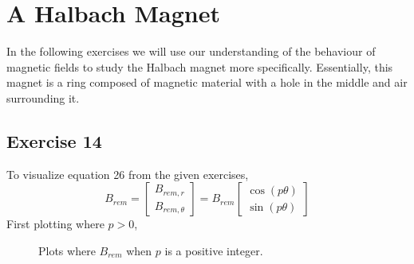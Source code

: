 \documentclass{article}
\begin{document}
\section{A Halbach Magnet}
In the following exercises we will use our understanding of the behaviour of magnetic fields to study the Halbach magnet more specifically. Essentially, this magnet is a ring composed of magnetic material with a hole in the middle and air surrounding it. 

\subsection{Exercise 14}
To visualize equation 26 from the given exercises,
\begin{equation}
    B_{\mathit{rem}}=\left[\begin{array}{c}
B_{\mathit{rem},r} 
\\
 B_{\mathit{rem},\theta} 
\end{array}\right]=B_{\mathit{rem}}\left[\begin{array}{c}
\cos\left(p\mathit{\theta}\right) 
\\
 \sin\left(p\mathit{\theta}\right) 
\end{array}\right]
\end{equation}
First plotting where $p > 0$,
\begin{figure}[h]
\centering
\caption{Plots where $B_{rem}$ when $p$ is a positive integer.}
\end{figure}
\end{document}
